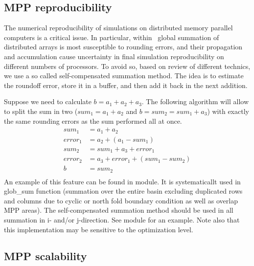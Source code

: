 \documentclass[../main/NEMO_manual]{subfiles}
\begin{document}
\subsection{MPP reproducibility}
\label{subsec:MISC_glosum}

The numerical reproducibility of simulations on distributed memory parallel computers is a critical issue.
In particular, within \NEMO\ global summation of distributed arrays is most susceptible to rounding errors,
and their propagation and accumulation cause uncertainty in final simulation reproducibility on
different numbers of processors.
To avoid so, based on \citet{he.ding_JS01} review of different technics,
we use a so called self-compensated summation method.
The idea is to estimate the roundoff error, store it in a buffer, and then add it back in the next addition.

Suppose we need to calculate $b = a_1 + a_2 + a_3$.
The following algorithm will allow to split the sum in two
($sum_1 = a_{1} + a_{2}$ and $b = sum_2 = sum_1 + a_3$) with exactly the same rounding errors as
the sum performed all at once.
\begin{align*}
	sum_1 \ \  &= a_1 + a_2 \\
	error_1     &= a_2 + ( a_1 - sum_1 ) \\
	sum_2 \ \  &= sum_1 + a_3 + error_1 \\
	error_2     &= a_3 + error_1 + ( sum_1 - sum_2 ) \\
	b \qquad \ &= sum_2 \\
\end{align*}
An example of this feature can be found in  module.
It is systematicallt used in glob\_sum function (summation over the entire basin excluding duplicated rows and
columns due to cyclic or north fold boundary condition as well as overlap MPP areas).
The self-compensated summation method should be used in all summation in i- and/or j-direction.
See  module for an example.
Note also that this implementation may be sensitive to the optimization level.

\subsection{MPP scalability}
\label{subsec:MISC_mppsca}
\end{document}
